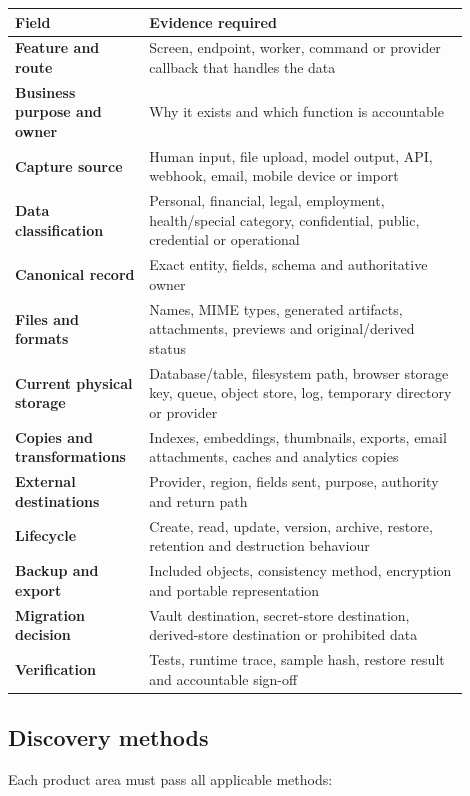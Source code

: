 \documentclass[11pt]{article}
\begin{document}
\begin{longtable}{>{\raggedright\arraybackslash\bfseries}p{0.25\linewidth} p{0.65\linewidth}}
\toprule
Field & Evidence required \\
\midrule
\endhead
Feature and route & Screen, endpoint, worker, command or provider callback that handles the data \\
Business purpose and owner & Why it exists and which function is accountable \\
Capture source & Human input, file upload, model output, API, webhook, email, mobile device or import \\
Data classification & Personal, financial, legal, employment, health/special category, confidential, public, credential or operational \\
Canonical record & Exact entity, fields, schema and authoritative owner \\
Files and formats & Names, MIME types, generated artifacts, attachments, previews and original/derived status \\
Current physical storage & Database/table, filesystem path, browser storage key, queue, object store, log, temporary directory or provider \\
Copies and transformations & Indexes, embeddings, thumbnails, exports, email attachments, caches and analytics copies \\
External destinations & Provider, region, fields sent, purpose, authority and return path \\
Lifecycle & Create, read, update, version, archive, restore, retention and destruction behaviour \\
Backup and export & Included objects, consistency method, encryption and portable representation \\
Migration decision & Vault destination, secret-store destination, derived-store destination or prohibited data \\
Verification & Tests, runtime trace, sample hash, restore result and accountable sign-off \\
\bottomrule
\end{longtable}

\subsection{Discovery methods}

Each product area must pass all applicable methods:
\end{document}
